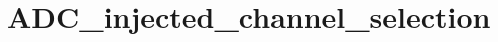 \hypertarget{group___a_d_c__injected__channel__selection}{\section{A\-D\-C\-\_\-injected\-\_\-channel\-\_\-selection}
\label{group___a_d_c__injected__channel__selection}
}
